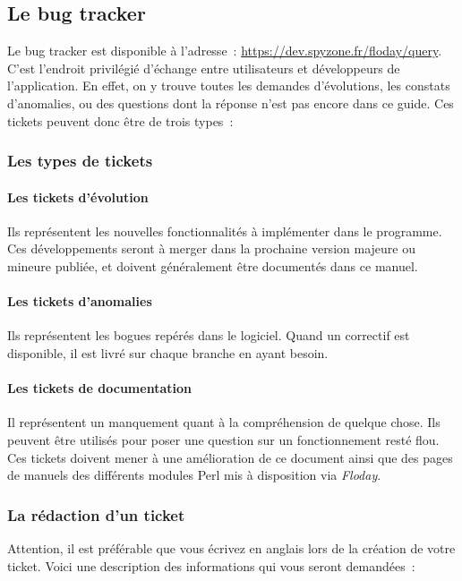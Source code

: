 \subsection{Le bug tracker}
\label{sec:contribution_bt}

Le bug tracker est disponible à l'adresse~: \url{https://dev.spyzone.fr/floday/query}.
C'est l'endroit privilégié d'échange entre utilisateurs et développeurs de l'application.
En effet, on y trouve toutes les demandes d'évolutions, les constats d'anomalies, ou des questions dont la réponse n'est pas encore dans ce guide.
Ces tickets peuvent donc être de trois types~:

\subsubsection{Les types de tickets}
\paragraph{Les tickets d'évolution} Ils représentent les nouvelles fonctionnalités à implémenter dans le programme. Ces développements seront à merger dans la prochaine version majeure ou mineure publiée, et doivent généralement être documentés dans ce manuel.
\paragraph{Les tickets d'anomalies} Ils représentent les bogues repérés dans le logiciel. Quand un correctif est disponible, il est livré sur chaque branche en ayant besoin.
\paragraph{Les tickets de documentation} Il représentent un manquement quant à la compréhension de quelque chose. Ils peuvent être utilisés pour poser une question sur un fonctionnement resté flou.
Ces tickets doivent mener à une amélioration de ce document ainsi que des pages de manuels des différents modules Perl mis à disposition via \emph{Floday}.

\subsubsection{La rédaction d'un ticket}
Attention, il est préférable que vous écrivez en anglais lors de la création de votre ticket.
Voici une description des informations qui vous seront demandées~:
\newline

